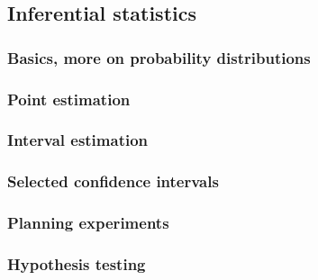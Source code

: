 \documentclass{article}
\begin{document}
\newpage

\subsection{Inferential statistics}

\subsubsection{Basics, more on probability distributions}

\begin{multicols}{2}

\end{multicols}

\newpage

\subsubsection{Point estimation}

\begin{multicols}{2}

\end{multicols}

\newpage

\subsubsection{Interval estimation}

\begin{multicols}{2}

\end{multicols}

\subsubsection{Selected confidence intervals}

\begin{multicols}{3}

\end{multicols}

\subsubsection{Planning experiments}

\begin{multicols}{2}

\end{multicols}

\newpage

\subsubsection{Hypothesis testing}
\end{document}
